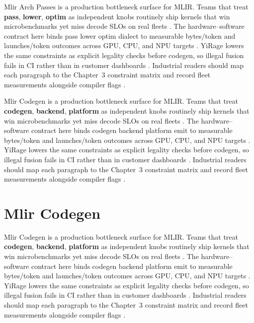 Mlir Arch Passes is a production bottleneck surface for MLIR. Teams that treat \textbf{pass}, \textbf{lower}, \textbf{optim} as independent knobs routinely ship kernels that win microbenchmarks yet miss decode SLOs on real fleets \citep{patel2025llminference,nvidia2022hopper}. The hardware--software contract here binds pass lower optim dialect to measurable bytes/token and launches/token outcomes across GPU, CPU, and NPU targets \citep{taxbreak2026,semianalysis2024tma}. YiRage lowers the same constraints as explicit legality checks before codegen, so illegal fusion fails in CI rather than in customer dashboards \citep{memoryfloor2026,amd2024xdna}. Industrial readers should map each paragraph to the Chapter~3 constraint matrix and record fleet measurements alongside compiler flags \citep{nvidia2022hopper,amd2024aie}.

Mlir Codegen is a production bottleneck surface for MLIR. Teams that treat \textbf{codegen}, \textbf{backend}, \textbf{platform} as independent knobs routinely ship kernels that win microbenchmarks yet miss decode SLOs on real fleets \citep{taxbreak2026,semianalysis2024tma}. The hardware--software contract here binds codegen backend platform emit to measurable bytes/token and launches/token outcomes across GPU, CPU, and NPU targets \citep{memoryfloor2026,amd2024xdna}. YiRage lowers the same constraints as explicit legality checks before codegen, so illegal fusion fails in CI rather than in customer dashboards \citep{nvidia2022hopper,amd2024aie}. Industrial readers should map each paragraph to the Chapter~3 constraint matrix and record fleet measurements alongside compiler flags \citep{semianalysis2024tma,dlbook}.

\section{Mlir Codegen}
\label{sec:mlir_codegen}

Mlir Codegen is a production bottleneck surface for MLIR. Teams that treat \textbf{codegen}, \textbf{backend}, \textbf{platform} as independent knobs routinely ship kernels that win microbenchmarks yet miss decode SLOs on real fleets \citep{memoryfloor2026,amd2024xdna}. The hardware--software contract here binds codegen backend platform emit to measurable bytes/token and launches/token outcomes across GPU, CPU, and NPU targets \citep{nvidia2022hopper,amd2024aie}. YiRage lowers the same constraints as explicit legality checks before codegen, so illegal fusion fails in CI rather than in customer dashboards \citep{semianalysis2024tma,dlbook}. Industrial readers should map each paragraph to the Chapter~3 constraint matrix and record fleet measurements alongside compiler flags \citep{amd2024xdna,dao2022flashattention}.


